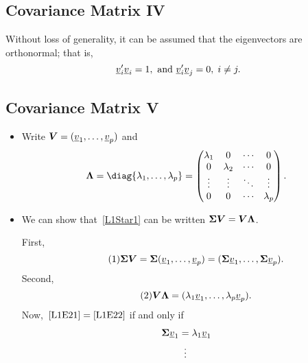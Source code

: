 \subsection*{Covariance Matrix IV}
Without loss of generality, it can be assumed that the eigenvectors are orthonormal; that is,
\[ \underline{v}_i'\underline{v}_i=1,\text{ and } \underline{v}_i'\underline{v}_j=0,\; i\ne j. \]
\subsection*{Covariance Matrix V}
\begin{itemize}
      \item Write $ \bm{V}=(\underline{v}_1,\ldots,\underline{v}_p) $ and
            \[ \Matrix{\Lambda}=\diag{\lambda_1,\ldots,\lambda_p}=\begin{pmatrix}
                        \lambda_1 & 0         & \cdots & 0         \\
                        0         & \lambda_2 & \cdots & 0         \\
                        \vdots    & \vdots    & \ddots & \vdots    \\
                        0         & 0         & \cdots & \lambda_p
                  \end{pmatrix}. \]
      \item We can show that~\ref{L1Star1} can be written $ \bm{\Sigma}\bm{V}=\bm{V}\bm{\Lambda} $.
            \begin{framed}
                  First,
                  \begin{equation}\tag*{(1)}\label{L1E21}
                        \bm{\Sigma}\bm{V}=\bm{\Sigma}(\underline{v}_1,\ldots,\underline{v}_p)\\
                        =(\bm{\Sigma}\underline{v}_1,\ldots,\bm{\Sigma}\underline{v}_p).
                  \end{equation}
                  Second,
                  \begin{equation}\tag*{(2)}\label{L1E22}
                        \bm{V}\bm{\Lambda}=(\lambda_1 \underline{v}_1,\ldots,\lambda_p \underline{v}_p).
                  \end{equation}
                  Now,~$\ref{L1E21}=\ref{L1E22}$ if and only if
                  \begin{align*}
                        \Matrix{\Sigma}\Vector{v}_1 & =\lambda_1 \Vector{v}_1  \\
                                                    & \vdotswithin{=}          \\

\end{align*}
\end{framed}
\end{itemize}
